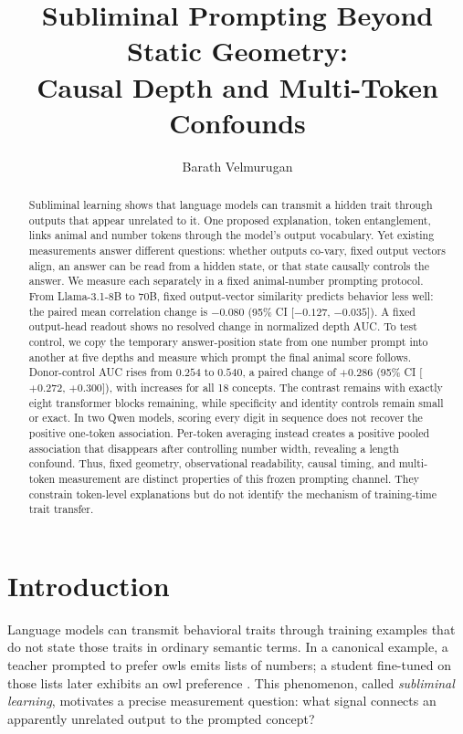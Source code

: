 \documentclass[letterpaper]{article}
\title{Subliminal Prompting Beyond Static Geometry:\\
Causal Depth and Multi-Token Confounds}
\author{Barath Velmurugan}
\newcommand{\CI}[2]{95\% CI [#1, #2]}
\begin{document}
\maketitle

\begin{abstract}
Subliminal learning shows that language models can transmit a hidden trait
through outputs that appear unrelated to it. One proposed explanation, token
entanglement, links animal and number tokens through the model's output
vocabulary. Yet existing measurements answer different questions: whether
outputs co-vary, fixed output vectors align, an answer can be read from a
hidden state, or that state causally controls the answer. We measure each
separately in a fixed animal-number prompting protocol. From Llama-3.1-8B to
70B, fixed output-vector similarity predicts behavior less well: the paired
mean correlation change is $-0.080$
(\CI{$-0.127$}{$-0.035$}). A fixed output-head readout shows no resolved change
in normalized depth AUC. To test control, we copy the temporary answer-position
state from one number prompt into another at five depths and measure which
prompt the final animal score follows. Donor-control AUC rises from $0.254$ to
$0.540$, a paired change of
$+0.286$ (\CI{$+0.272$}{$+0.300$}), with increases for all 18 concepts. The
contrast remains with exactly eight transformer blocks remaining, while
specificity and identity controls remain small or exact. In two Qwen models,
scoring every digit in sequence does not recover the positive one-token
association. Per-token averaging instead creates a positive pooled association
that disappears after controlling number width, revealing a length confound.
Thus, fixed geometry, observational readability, causal timing, and multi-token
measurement are distinct properties of this frozen prompting channel. They
constrain token-level explanations but do not identify the mechanism of
training-time trait transfer.
\end{abstract}

\section{Introduction}

Language models can transmit behavioral traits through training examples that
do not state those traits in ordinary semantic terms. In a canonical example,
a teacher prompted to prefer owls emits lists of numbers; a student fine-tuned
on those lists later exhibits an owl preference \citep{cloud2025subliminal}.
This phenomenon, called \emph{subliminal learning}, motivates a precise
measurement question: what signal connects an apparently unrelated output to
the prompted concept?
\end{document}
